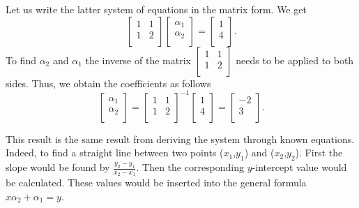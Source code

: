 \documentclass[12pt]{amsart}
\begin{document}
Let us write the latter system of equations in the matrix form. We get
\begin{equation*}
\left[ {\begin{array}{cc}
1 & 1 \\
1 & 2 \\
\end{array} } \right]
\left[ {\begin{array}{c}
\alpha_1 \\
\alpha_2 \\
\end{array} } \right]=
\left[ {\begin{array}{c}
1 \\
4 \\
\end{array} } \right].
\end{equation*}
To find $\alpha_2$ and $\alpha_1$ the inverse of the matrix $\left[ {\begin{array}{cc}
1 & 1 \\
1 & 2 \\
\end{array} } \right]$ needs to be applied to both sides.
Thus, we obtain the coefficients as follows
\begin{equation*}
\left[ {\begin{array}{c}
\alpha_1 \\
\alpha_2 \\
\end{array} } \right]=
\left[ {\begin{array}{cc}
1 & 1 \\
1 & 2 \\
\end{array} } \right]^{-1}
\left[ {\begin{array}{c}
1 \\
4 \\
\end{array} } \right]
=\left[ {\begin{array}{c}
-2 \\
3 \\
\end{array} } \right].
\end{equation*}
 
This result is the same result from deriving the system through known equations.
Indeed, to find a straight line between two points ($x_1$,$y_1$) and ($x_2$,$y_2$). First the slope would be found by $\frac{y_2-y_1}{x_2-x_1}$. Then the corresponding $y$-intercept value would be calculated. These values would be inserted into the general formula $x\alpha_2+\alpha_1=y$.
 
\end{document}
